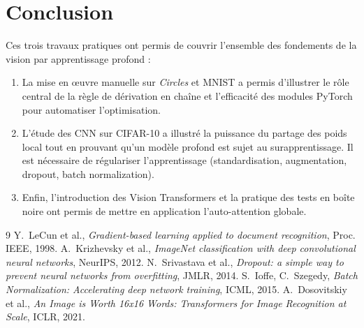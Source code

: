 \documentclass{report}
\begin{document}
\chapter*{Conclusion}

\noindent
Ces trois travaux pratiques ont permis de couvrir l'ensemble des fondements de la vision par apprentissage profond :
\begin{enumerate}
    \item La mise en œuvre manuelle sur \textit{Circles} et MNIST a permis d'illustrer le rôle central de la règle de dérivation en chaîne et l'efficacité des modules PyTorch pour automatiser l'optimisation.
    \item L'étude des CNN sur CIFAR-10 a illustré la puissance du partage des poids local tout en prouvant qu'un modèle profond est sujet au surapprentissage. Il est nécessaire de régulariser l'apprentissage (standardisation, augmentation, dropout, batch normalization).
    \item Enfin, l'introduction des Vision Transformers et la pratique des tests en boîte noire ont permis de mettre en application l'auto-attention globale.
\end{enumerate}

\begin{thebibliography}{9}
 Y.~LeCun et al., \textit{Gradient-based learning applied to document recognition}, Proc. IEEE, 1998.
 A.~Krizhevsky et al., \textit{ImageNet classification with deep convolutional neural networks}, NeurIPS, 2012.
 N.~Srivastava et al., \textit{Dropout: a simple way to prevent neural networks from overfitting}, JMLR, 2014.
 S.~Ioffe, C.~Szegedy, \textit{Batch Normalization: Accelerating deep network training}, ICML, 2015.
 A.~Dosovitskiy et al., \textit{An Image is Worth 16x16 Words: Transformers for Image Recognition at Scale}, ICLR, 2021.
\end{thebibliography}
\end{document}
